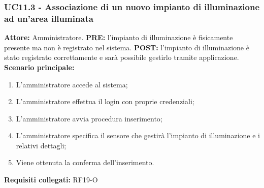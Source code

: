 \documentclass[a4paper, 12pt]{article}
\begin{document}
\subsubsection{UC11.3 - Associazione di un nuovo impianto di illuminazione ad un'area illuminata}
\textbf{Attore:} Amministratore.\newline
\textbf{PRE:} l'impianto di illuminazione è fisicamente presente ma non è registrato nel sistema.\newline
\textbf{POST:} l'impianto di illuminazione è stato registrato correttamente e sarà possibile gestirlo tramite applicazione.\newline
\textbf{Scenario principale:}
\begin{enumerate}
    \item L'amministratore accede al sistema;
    \item L'amministratore effettua il login con proprie credenziali;
    \item L'amministratore avvia procedura inserimento;
    \item L'amministratore specifica il sensore che gestirà l'impianto di illuminazione e i relativi dettagli;
    \item Viene ottenuta la conferma dell'inserimento.
\end{enumerate}
\textbf{Requisiti collegati:} RF19-O\newline
\end{document}
